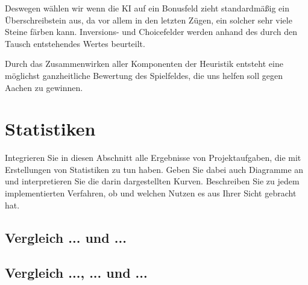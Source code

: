 \documentclass[12pt,a4paper,bibliography=totocnumbered,listof=totocnumbered]{scrartcl}
\begin{document}
	Deswegen wählen wir wenn die KI auf ein Bonusfeld zieht standardmäßig ein Überschreibstein aus, da vor allem in den letzten Zügen, ein solcher sehr viele Steine färben kann. Inversions- und Choicefelder werden anhand des durch den Tausch entstehendes Wertes beurteilt.
	
	Durch das Zusammenwirken aller Komponenten der Heuristik entsteht eine möglichst ganzheitliche Bewertung des Spielfeldes, die uns helfen soll gegen Aachen zu gewinnen.

    \newpage
    \section{Statistiken}
    \vspace{1em}
    Integrieren Sie in diesen Abschnitt alle Ergebnisse von Projektaufgaben, die mit Erstellungen von Statistiken zu tun haben. Geben Sie dabei auch Diagramme an und interpretieren Sie die darin dargestellten Kurven. Beschreiben Sie zu jedem implementierten Verfahren, ob und welchen Nutzen es aus Ihrer Sicht gebracht hat.




	

    \subsection{Vergleich ... und ...}
    \vspace{1em}

    \subsection{Vergleich ..., ... und ...}
    \vspace{1em}
\end{document}
